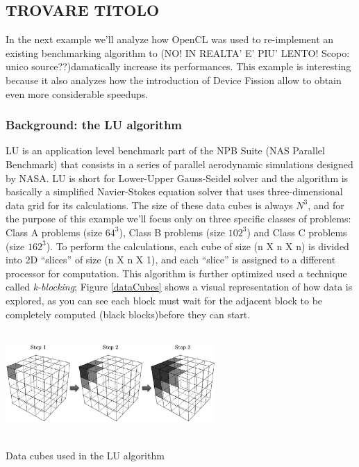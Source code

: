 
\subsection{TROVARE TITOLO}

In the next example \cite{Pennycook2012} we'll analyze how OpenCL was used to re-implement an existing benchmarking algorithm to (NO! IN REALTA' E' PIU' LENTO! Scopo: unico source??)damatically increase its performances. This example is interesting because it also analyzes how the introduction of Device Fission allow to obtain even more considerable speedups.

\subsubsection{Background: the LU algorithm}

LU is an application level benchmark part of the NPB Suite (NAS Parallel Benchmark) that consists in a series of parallel aerodynamic simulations designed by NASA. LU is short for Lower-Upper Gauss-Seidel solver and the algorithm is basically a simplified Navier-Stokes equation solver that uses three-dimensional data grid for its calculations. The size of these data cubes is always \begin{math}N^3\end{math}, and for the purpose of this example we'll focus only on three specific classes of problems: Class A problems (size \begin{math}64^3\end{math}), Class B problems (size \begin{math}102^3\end{math}) and Class C problems (size \begin{math}162^3\end{math}).
To perform the calculations, each cube of size (n X n X n) is divided into 2D "`slices"' of size (n X n X 1), and each "`slice"' is assigned to a different processor for computation. This algorithm is further optimized used a technique called \textit{k-blocking}; Figure \ref{dataCubes} shows a visual representation of how data is explored, as you can see each block must wait for the adjacent block to be completely computed (black blocks)before they can start.

\begin{figurehere}
 \centering
 \includegraphics[width=8cm, height=4cm]{./eps/dataCube.eps}
 \caption{Data cubes used in the LU algorithm}
 \label{fig:dataCubes}
\end{figurehere}


